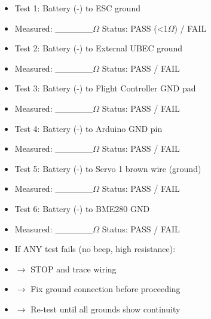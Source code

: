 \documentclass[11pt,letterpaper]{article}
\begin{document}
\begin{itemize}
  \item Test 1: Battery (-) to ESC ground
  \item Measured: \_\_\_\_\_\_$\Omega$    Status: PASS (<1$\Omega$) / FAIL
\end{itemize}

\begin{itemize}
  \item Test 2: Battery (-) to External UBEC ground
  \item Measured: \_\_\_\_\_\_$\Omega$    Status: PASS / FAIL
\end{itemize}

\begin{itemize}
  \item Test 3: Battery (-) to Flight Controller GND pad
  \item Measured: \_\_\_\_\_\_$\Omega$    Status: PASS / FAIL
\end{itemize}

\begin{itemize}
  \item Test 4: Battery (-) to Arduino GND pin
  \item Measured: \_\_\_\_\_\_$\Omega$    Status: PASS / FAIL
\end{itemize}

\begin{itemize}
  \item Test 5: Battery (-) to Servo 1 brown wire (ground)
  \item Measured: \_\_\_\_\_\_$\Omega$    Status: PASS / FAIL
\end{itemize}

\begin{itemize}
  \item Test 6: Battery (-) to BME280 GND
  \item Measured: \_\_\_\_\_\_$\Omega$    Status: PASS / FAIL
\end{itemize}

\begin{itemize}
  \item If ANY test fails (no beep, high resistance):
  \item $\rightarrow$ STOP and trace wiring
  \item $\rightarrow$ Fix ground connection before proceeding
  \item $\rightarrow$ Re-test until all grounds show continuity
\end{itemize}
\end{document}
